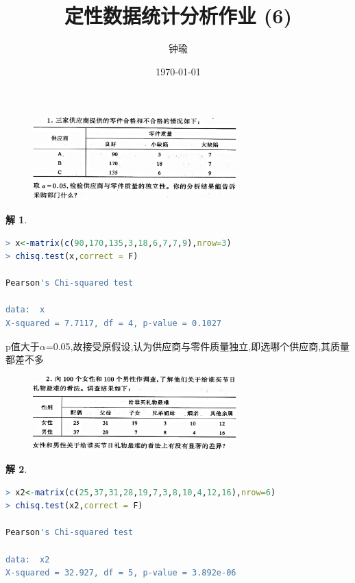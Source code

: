 \documentclass[11pt,a4paper]{ctexart}
\title{定性数据统计分析作业 (6)}
\author{钟瑜 \quad 222018314210044}
\date{\today}
\newtheorem*{solution}{解}
\begin{document}
\maketitle
\pagestyle{plain}%
\begin{figure}[H]
	\centering
	\includegraphics[width=0.7\textwidth]{screenshot001}
	\label{fig:screenshot001}
\end{figure}
\begin{solution}
\end{solution}
\begin{lstlisting}[language=r]
> x<-matrix(c(90,170,135,3,18,6,7,7,9),nrow=3)
> chisq.test(x,correct = F)

Pearson's Chi-squared test

data:  x
X-squared = 7.7117, df = 4, p-value = 0.1027
\end{lstlisting}
p值大于$ \alpha $=0.05,故接受原假设,认为供应商与零件质量独立,即选哪个供应商,其质量都差不多\\
\begin{figure}[H]
	\centering
	\includegraphics[width=0.7\textwidth]{screenshot002}
	\label{fig:screenshot002}
\end{figure}
\begin{solution}
\end{solution}
\begin{lstlisting}[language=r]
> x2<-matrix(c(25,37,31,28,19,7,3,8,10,4,12,16),nrow=6)
> chisq.test(x2,correct = F)

Pearson's Chi-squared test

data:  x2
X-squared = 32.927, df = 5, p-value = 3.892e-06
\end{lstlisting}
\end{document}
